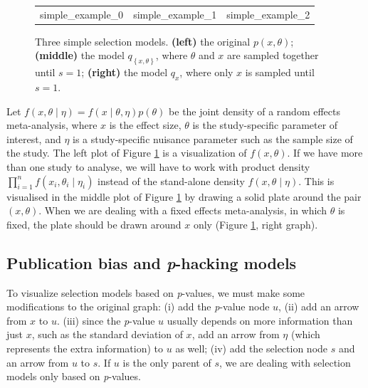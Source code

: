 \documentclass{article}
\theoremstyle{plain}
\theoremstyle{definition}
\begin{document}
\begin{figure}
\begin{center}     
 \begin{tabular}{ccc}   
  {simple_example_0} &   
   {simple_example_1} & 
   {simple_example_2}
 \end{tabular} 
\end{center}

\caption{\label{fig:Plate notation, simple example} Three simple selection models. {\bf (left)} the original $p(x,\theta)$; {\bf (middle)} the model $q_{\left\{ x,\theta\right\} }$, where $\theta$ and $x$ are
sampled together until $s=1$; {\bf (right)} the model $q_{x}$, where only $x$ is sampled until $s=1$.}
\end{figure}

Let $f(x,\theta\mid\eta)=f(x\mid\theta,\eta)p(\theta)$
be the joint density of a random effects meta-analysis, where $x$ is the effect size, $\theta$ is the study-specific parameter of interest, and $\eta$ is a study-specific nuisance parameter such as the sample size of the study. The left plot of Figure \ref{fig:Plate notation, simple example} is a visualization of $f(x,\theta)$. If we have more than one study to analyse, we will have to work with product density $\prod_{i=1}^{n}f(x_{i},\theta_{i}\mid\eta_{i})$ instead of the stand-alone density $f(x,\theta\mid\eta)$. This is visualised in the middle plot of Figure \ref{fig:Plate notation, simple example}  by drawing a solid plate around the pair $(x,\theta)$. When we are dealing with a fixed effects meta-analysis, in which $\theta$ is fixed, the plate should be drawn around $x$ only (Figure \ref{fig:Plate notation, simple example}, right graph). 


\subsection{Publication bias and \textit{p}-hacking models\label{subsec:Selection sets, meta analysis}}

To visualize selection models based on \textit{p}-values, we must make some modifications to the original graph: (i) add the \textit{p}-value node $u$, (ii) add an arrow from $x$ to $u$. (iii) since the \textit{p}-value $u$ usually depends on more information than just $x$, such as the standard deviation of $x$, add an arrow from $\eta$ (which represents the extra information) to $u$ as well; (iv) add the selection node $s$ and an arrow from $u$ to $s$. If $u$ is the only parent of $s$, we are dealing with selection models only based on
\textit{p}-values. 
\end{document}
